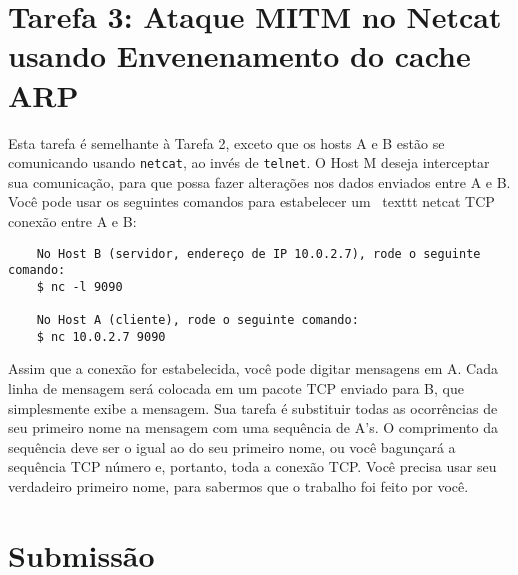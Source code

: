 	
	
	
	
	\section{Tarefa 3: Ataque MITM no Netcat usando Envenenamento do cache ARP}
	
	Esta tarefa é semelhante à Tarefa 2, exceto que
	os hosts A e B estão se comunicando usando \texttt{netcat}, ao invés de \texttt{telnet}.
	O Host M deseja interceptar sua
	comunicação, para que possa fazer alterações nos dados enviados entre A e B.
	Você pode usar os seguintes comandos para estabelecer um \ texttt {netcat} TCP
	conexão entre A e B:
	
	
	\begin{lstlisting}
	No Host B (servidor, endereço de IP 10.0.2.7), rode o seguinte comando:
	$ nc -l 9090
	
	No Host A (cliente), rode o seguinte comando:
	$ nc 10.0.2.7 9090
	\end{lstlisting}
	
	
	Assim que a conexão for estabelecida, você pode digitar mensagens em A.
	Cada linha de mensagem será colocada em um pacote TCP enviado
	para B, que simplesmente exibe a mensagem.
	Sua tarefa é substituir todas as ocorrências de seu primeiro nome na
	mensagem com uma sequência de A's. O comprimento da sequência deve ser o
	igual ao do seu primeiro nome, ou você bagunçará a sequência TCP
	número e, portanto, toda a conexão TCP. Você precisa usar seu verdadeiro
	primeiro nome, para sabermos que o trabalho foi feito por você.
	
	
	
	\section{Submissão}
	
	\seedsubmission
	
	




